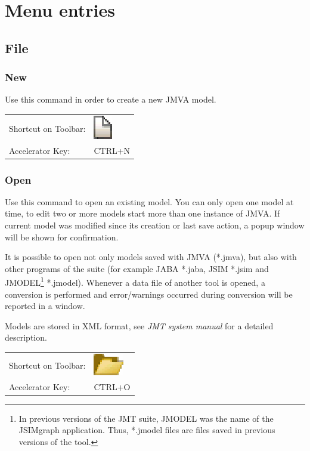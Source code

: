 \section{Menu entries}
\label{sec:jmva:Menu}
\subsection{File}
\subsubsection{New}
Use this command in order to create a new JMVA model.

\noindent
\begin{tabular}{ll}
Shortcut on Toolbar: & \includegraphics[scale=.8]{img/jmva/new}\\
Accelerator Key: & CTRL+N
\end{tabular}

\subsubsection{Open}
Use this command to open an existing model. You can only open one
model at time, to edit two or more models start more than one
instance of JMVA. If current model was modified since its creation
or last save action, a popup window will be shown for confirmation.

\noindent It is possible to open not only models saved with JMVA (*.jmva), but
also with other programs of the suite (for example JABA *.jaba, JSIM
*.jsim and JMODEL\footnote{In previous versions of the JMT suite, JMODEL was the name of the JSIMgraph application. Thus, *.jmodel files are files saved in previous versions of the tool.} *.jmodel). Whenever a data file of another tool is opened, a
conversion is performed and error/warnings occurred during
conversion will be reported in a window.

\noindent Models are stored in XML format, see \emph{JMT system manual} for a
detailed description.

\noindent
\begin{tabular}{ll}
Shortcut on Toolbar: & \includegraphics[scale=.8]{img/jmva/open}\\
Accelerator Key: & CTRL+O
\end{tabular}

